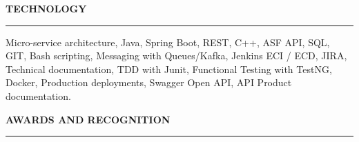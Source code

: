\documentclass[10pt,letterpaper]{article}
\newlength{\blockindent}   \setlength{\blockindent}{11.5pt}
\newlength{\textrightinset}\setlength{\textrightinset}{5.25pt}   %
\newcommand{\sectionbar}[3]{%
  \par\vspace{#1}%
  \centerline{\bfseries\fontsize{10.5}{12}\selectfont #3}%
  \par\nointerlineskip\vspace{3pt}%
  \noindent\rule{\linewidth}{#2}\par\vspace{1pt}}
\newcommand{\sect}[2][9pt]{\sectionbar{#1}{1.3pt}{#2}}
\newenvironment{indented}{%
  \list{}{\leftmargin=\blockindent\rightmargin=\textrightinset\topsep=0pt\partopsep=0pt
          \parsep=0pt\itemsep=0pt\listparindent=0pt}\item\relax}{\endlist}
\begin{document}
\sect[23pt]{TECHNOLOGY}
\vspace{-1pt}
\begin{indented}
Micro-service architecture, Java, Spring Boot, REST, C++, ASF API, SQL, GIT, Bash
scripting, Messaging with Queues/Kafka, Jenkins ECI / ECD, JIRA, Technical documentation,
TDD with Junit, Functional Testing with TestNG, Docker, Production deployments, Swagger Open
API, API Product documentation.
\end{indented}

\sect[23pt]{AWARDS AND RECOGNITION}
\vspace{-1pt}
\end{document}
